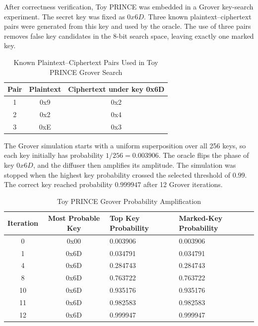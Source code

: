 \documentclass[12pt,a4paper]{report}
\begin{document}
After correctness verification, Toy PRINCE was embedded in a Grover key-search experiment. The secret key was fixed as $0x6D$. Three known plaintext--ciphertext pairs were generated from this key and used by the oracle. The use of three pairs removes false key candidates in the 8-bit search space, leaving exactly one marked key.

\begin{table}[H]
\centering
\caption{Known Plaintext--Ciphertext Pairs Used in Toy PRINCE Grover Search}
\label{tab:toy_prince_known_pairs}
\begin{tabular}{|c|c|c|}
\hline
\textbf{Pair} & \textbf{Plaintext} & \textbf{Ciphertext under key 0x6D} \\
\hline
1 & 0x9 & 0x2 \\
\hline
2 & 0x2 & 0x4 \\
\hline
3 & 0xE & 0x3 \\
\hline
\end{tabular}
\end{table}

The Grover simulation starts with a uniform superposition over all 256 keys, so each key initially has probability $1/256 = 0.003906$. The oracle flips the phase of key $0x6D$, and the diffuser then amplifies its amplitude. The simulation was stopped when the highest key probability crossed the selected threshold of $0.99$. The correct key reached probability $0.999947$ after 12 Grover iterations.

\begin{table}
\centering
\caption{Toy PRINCE Grover Probability Amplification}
\label{tab:toy_prince_grover_summary}
\small
\begin{tabularx}{\textwidth}{|c|c|X|X|}
\hline
\textbf{Iteration} & \textbf{Most Probable Key} & \textbf{Top Key Probability} & \textbf{Marked-Key Probability} \\
\hline
0 & 0x00 & 0.003906 & 0.003906 \\
\hline
1 & 0x6D & 0.034791 & 0.034791 \\
\hline
4 & 0x6D & 0.284743 & 0.284743 \\
\hline
8 & 0x6D & 0.763722 & 0.763722 \\
\hline
10 & 0x6D & 0.935176 & 0.935176 \\
\hline
11 & 0x6D & 0.982583 & 0.982583 \\
\hline
12 & 0x6D & 0.999947 & 0.999947 \\
\hline
\end{tabularx}
\end{table}
\end{document}
